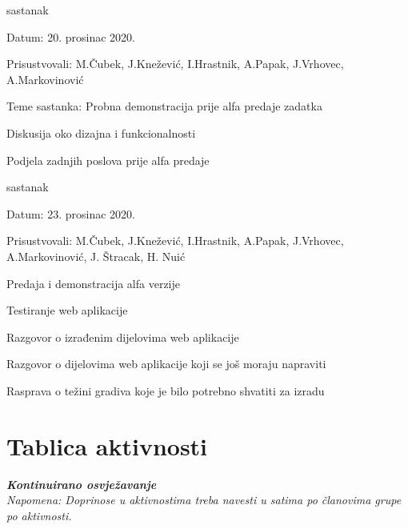 \begin{packed_enum}
			\item  sastanak
			\item[] \begin{packed_item}
				\item Datum: 20. prosinac 2020.
				\item Prisustvovali: M.Čubek, J.Knežević, I.Hrastnik, A.Papak,  J.Vrhovec, A.Markovinović
				\item Teme sastanka: Probna demonstracija prije alfa predaje zadatka
				\begin{packed_item}
					\item Diskusija oko dizajna i funkcionalnosti
					\item Podjela zadnjih poslova prije alfa predaje
				\end{packed_item}
			\end{packed_item}
		
			\item  sastanak
			\item[] \begin{packed_item}
				\item Datum: 23. prosinac 2020.
				\item Prisustvovali: M.Čubek, J.Knežević, I.Hrastnik, A.Papak,  J.Vrhovec, A.Markovinović, J. Štracak, H. Nuić
				\item Predaja i demonstracija alfa verzije
				\begin{packed_item}
					\item Testiranje web aplikacije
					\item Razgovor o izrađenim dijelovima web aplikacije
					\item Razgovor o dijelovima web aplikacije koji se još moraju napraviti
					\item Rasprava o težini gradiva koje je bilo potrebno shvatiti za izradu
				\end{packed_item}
			\end{packed_item}
					
			
		\end{packed_enum}
		
		\eject
		\section*{Tablica aktivnosti}
		
			\textbf{\textit{Kontinuirano osvježavanje}}\\
			
			 \textit{Napomena: Doprinose u aktivnostima treba navesti u satima po članovima grupe po aktivnosti.}
					
